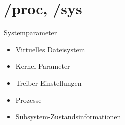 \section[/proc, /sys]{/proc, /sys}
\begin{frame}{Systemparameter}
\begin{itemize}
\item Virtuelles Dateisystem
\item Kernel-Parameter
\item Treiber-Einstellungen
\item Prozesse
\item Subsystem-Zustandsinformationen
\end{itemize}
\end{frame}